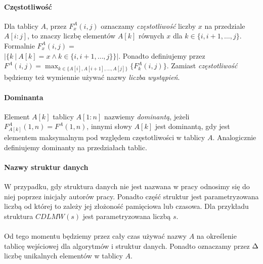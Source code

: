 \paragraph{Częstotliwość} Dla tablicy $A$, przez $F_x^A(i,j)$ oznaczamy \emph{częstotliwość} liczby $x$ na przedziale $A[i:j]$, to znaczy liczbę elementów $A[k]$ równych $x$ dla $k\in\{i, i+1, \dots, j\}$. Formalnie $F_x^A(i, j) = $\\$|\{k\ |\ A[k] = x \land k \in \{i, i+1, \dots, j\}\}|$. Ponadto definiujemy przez $F^A(i,j) = \max_{k \in \{A[i], A[i+1], \dots, A[j]\}}\{F^A_k(i,j)\}$. Zamiast \emph{częstotliwość} będziemy też wymiennie używać nazwy \emph{liczba wystąpień}.\vspace{-0.5em}
\paragraph{Dominanta} Element $A[k]$ tablicy $A[1:n]$ nazwiemy \emph{dominantą}, jeżeli $F^A_{A[k]}(1,n) = F^A(1,n)$, innymi słowy $A[k]$ jest dominantą, gdy jest elementem maksymalnym pod względem częstotliwości w tablicy $A$. Analogicznie definiujemy dominanty na przedziałach tablic.

\paragraph{Nazwy struktur danych} W przypadku, gdy struktura danych nie jest nazwana w pracy odnosimy się do niej poprzez inicjały autorów pracy. Ponadto część struktur jest parametryzowana liczbą od której to zależy jej złożoność pamięciowa lub czasowa. Dla przykładu struktura $CDLMW(s)$ jest parametryzowana liczbą $s$.

\paragraph{} \hspace{-1em}
Od tego momentu będziemy przez cały czas używać nazwy $A$ na określenie tablicę wejściowej dla algorytmów i struktur danych. Ponadto oznaczamy przez $\Delta$ liczbę unikalnych elementów w tablicy $A$.\vspace{-0.5em}
